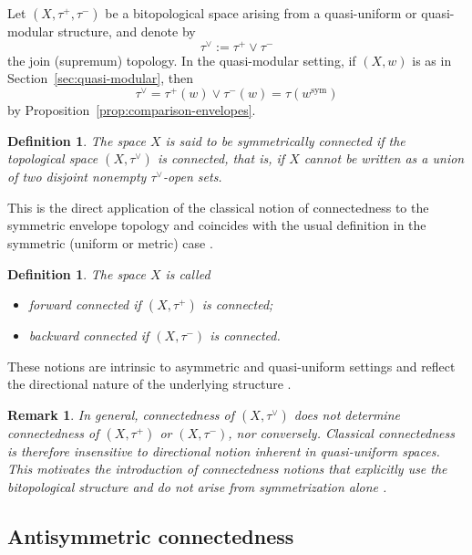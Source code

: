 \documentclass[preprint,12pt]{elsarticle}
\newtheorem{definition}[theorem]{Definition}
\newtheorem{remark}[theorem]{Remark}
\begin{document}
Let $(X,\tau^{+},\tau^{-})$ be a bitopological space arising from a
quasi-uniform or quasi-modular structure, and denote by
\[
\tau^\vee := \tau^{+}\vee\tau^{-}
\]
the join (supremum) topology.
In the quasi-modular setting, if $(X,w)$ is as in
Section~\ref{sec:quasi-modular}, then
\[
\tau^\vee=\tau^{+}(w)\vee\tau^{-}(w)=\tau(w^{\mathrm{sym}})
\]
by Proposition~\ref{prop:comparison-envelopes}.

\begin{definition}
\label{def:tau-vee-connected}
The space $X$ is said to be \emph{symmetrically connected} if the
topological space $(X,\tau^\vee)$ is connected, that is, if $X$ cannot
be written as a union of two disjoint nonempty $\tau^\vee$-open sets.
\end{definition}

\noindent
This is the direct application of the classical notion of connectedness
to the symmetric envelope topology and coincides with the usual
definition in the symmetric (uniform or metric) case
\cite{Kelley,Willard}.

\begin{definition}
\label{def:forward-backward-connected}
The space $X$ is called
\begin{itemize}
\item \emph{forward connected} if $(X,\tau^{+})$ is connected;
\item \emph{backward connected} if $(X,\tau^{-})$ is connected.
\end{itemize}
\end{definition}

\noindent
These notions are intrinsic to asymmetric and quasi-uniform settings
and reflect the directional nature of the underlying structure
\cite{FletcherLindgren,Kunzi2001,MarinRomaguera1998}.

\begin{remark}
\label{rem:classical-insufficient}
In general, connectedness of $(X,\tau^\vee)$ does not determine
connectedness of $(X,\tau^{+})$ or $(X,\tau^{-})$, nor conversely.
Classical connectedness is therefore insensitive to directional
notion inherent in quasi-uniform spaces. This motivates the
introduction of connectedness notions that explicitly use the
bitopological structure and do not arise from symmetrization alone
\cite{Kunzi2001}.
\end{remark}

\subsection{Antisymmetric connectedness}
\label{ssec:antisym-conn}
\end{document}
